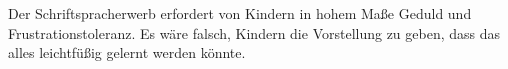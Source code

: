 Der Schriftspracherwerb erfordert von Kindern in hohem Maße Geduld und Frustrationstoleranz.
Es wäre falsch, Kindern die Vorstellung zu geben, dass das alles leichtfüßig gelernt werden könnte.